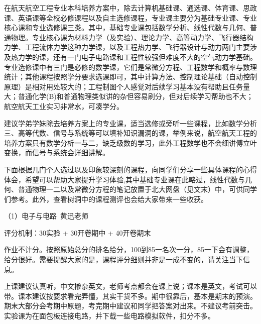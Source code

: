 \vspace{10pt}

在航天航空工程专业本科培养方案中，除去计算机基础课、通选课、体育课、思政课、英语课等全校必修课程以及自主选修课程，专业课主要分为基础专业课、专业核心课和专业选修课三类。其中，基础专业课包括数学分析、线性代数与几何、普通物理。专业核心课为材料力学（及实验）、理论力学、高等动力学、飞行器结构力学、工程流体力学这种力学课，以及工程热力学、飞行器设计与动力两门主要涉及热力学的课，还有一门电子电路课和工程性较强但难度不大的空气动力学基础。专业选修课中有三门是必修的数学课，它们是常微分方程、工程数学和概率与数理统计；其他课程按照学分要求选课即可，其中计算方法、控制理论基础（自动控制原理）是相对用处较大的；工程制图个人感觉对后续学习基本没有帮助且任务量大；普通化学(B)和普通物理类似讲的杂但容易刷分，但对后续学习帮助也不大；航空航天工业实习非常水，可凑学分。

\vspace{10pt}

建议学弟学妹除去培养方案上的专业课，适当选修或旁听一些课程，比如数学分析三、高等代数、信号与系统等可以填补知识漏洞的课，举例来说，航空航天工程的培养方案只有数学分析一与二，缺乏级数的学习，此外工程数学也不会细讲傅立叶变换，而信号与系统会详细讲解。

\vspace{10pt}

下面根据几门个人选过以及印象较深刻的课程，向同学们分享一些具体课程的心得体会，希望可以帮助大家提升学习体验,其中基础专业课在此略过，线性代数与几何、普通物理一二以及常微分方程的笔记放置于北大网盘（见文末）中，可供同学们参考。此外，查看树洞中的课程测评也会给大家带来一些收获。

\vspace{10pt}

（1）电子与电路\ 黄迅老师 

评分机制：30实验 + 30开卷期中 + 40开卷期末

作业不计分。按照原始总分的排名给分，100到85一名次一分，85一下会有调整，给分很好。需要提醒大家的是，课程评分细则并非是一成不变的，请关注当下信息。

\vspace{10pt}

上课建议认真听，中文掺杂英文，老师考点都会在课上说；课本是英文，考试可以带。课本建议按要求看完弄懂，其实干货不多。期中很靠后，基本是期末的预演。期末大部分会考期中原题，考完期中建议和同学把答案对出来。不建议考前突击。实验课为在面包板连接电路，并下载一些电路模拟软件，扣分不多。

\vspace{10pt}

